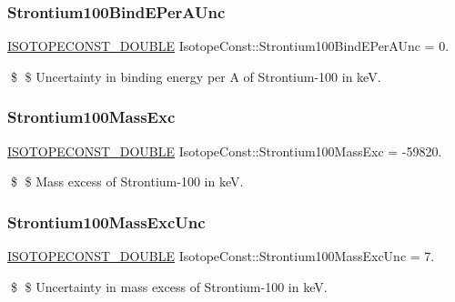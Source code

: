\subsubsection{\texorpdfstring{Strontium100\+Bind\+E\+Per\+A\+Unc}{Strontium100BindEPerAUnc}}
{\footnotesize\ttfamily \mbox{\hyperlink{group___isotope_const-_macros_ga8f45a7272ce02c0b4c65c44636ed719a}{I\+S\+O\+T\+O\+P\+E\+C\+O\+N\+S\+T\+\_\+\+D\+O\+U\+B\+LE}} Isotope\+Const\+::\+Strontium100\+Bind\+E\+Per\+A\+Unc = 0.}

\$ \$ Uncertainty in binding energy per A of Strontium-\/100 in keV. \mbox{\label{group___isotope_const-_strontium-_sr100_ga899d2bbe9ff8cce0d3711db85173ff89}} 
\subsubsection{\texorpdfstring{Strontium100\+Mass\+Exc}{Strontium100MassExc}}
{\footnotesize\ttfamily \mbox{\hyperlink{group___isotope_const-_macros_ga8f45a7272ce02c0b4c65c44636ed719a}{I\+S\+O\+T\+O\+P\+E\+C\+O\+N\+S\+T\+\_\+\+D\+O\+U\+B\+LE}} Isotope\+Const\+::\+Strontium100\+Mass\+Exc = -\/59820.}

\$ \$ Mass excess of Strontium-\/100 in keV. \mbox{\label{group___isotope_const-_strontium-_sr100_gac91126e0c83923debcbb72ab7cfa328d}} 
\subsubsection{\texorpdfstring{Strontium100\+Mass\+Exc\+Unc}{Strontium100MassExcUnc}}
{\footnotesize\ttfamily \mbox{\hyperlink{group___isotope_const-_macros_ga8f45a7272ce02c0b4c65c44636ed719a}{I\+S\+O\+T\+O\+P\+E\+C\+O\+N\+S\+T\+\_\+\+D\+O\+U\+B\+LE}} Isotope\+Const\+::\+Strontium100\+Mass\+Exc\+Unc = 7.}

\$ \$ Uncertainty in mass excess of Strontium-\/100 in keV. \mbox{\label{group___isotope_const-_strontium-_sr100_ga96a7eb0fe446b337bb1b7516d3316112}} 
